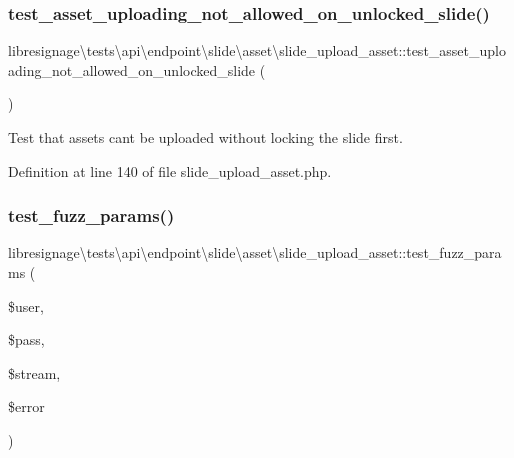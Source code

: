 \subsubsection{\texorpdfstring{test\+\_\+asset\+\_\+uploading\+\_\+not\+\_\+allowed\+\_\+on\+\_\+unlocked\+\_\+slide()}{test\_asset\_uploading\_not\_allowed\_on\_unlocked\_slide()}}
{\footnotesize\ttfamily libresignage\textbackslash{}tests\textbackslash{}api\textbackslash{}endpoint\textbackslash{}slide\textbackslash{}asset\textbackslash{}slide\+\_\+upload\+\_\+asset\+::test\+\_\+asset\+\_\+uploading\+\_\+not\+\_\+allowed\+\_\+on\+\_\+unlocked\+\_\+slide (\begin{DoxyParamCaption}{ }\end{DoxyParamCaption})}

Test that assets can\textquotesingle{}t be uploaded without locking the slide first. 

Definition at line 140 of file slide\+\_\+upload\+\_\+asset.\+php.

\mbox{\label{classlibresignage_1_1tests_1_1api_1_1endpoint_1_1slide_1_1asset_1_1slide__upload__asset_aec12095fcf316836e34be618bf8531b5}} 
\subsubsection{\texorpdfstring{test\+\_\+fuzz\+\_\+params()}{test\_fuzz\_params()}}
{\footnotesize\ttfamily libresignage\textbackslash{}tests\textbackslash{}api\textbackslash{}endpoint\textbackslash{}slide\textbackslash{}asset\textbackslash{}slide\+\_\+upload\+\_\+asset\+::test\+\_\+fuzz\+\_\+params (\begin{DoxyParamCaption}\item[{string}]{\$user,  }\item[{string}]{\$pass,  }\item[{Multipart\+Stream}]{\$stream,  }\item[{int}]{\$error }\end{DoxyParamCaption})}


